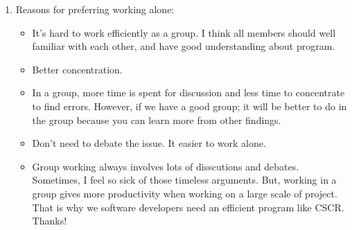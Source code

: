 \begin{enumerate}
\begin{itemize}
\end{itemize}

\item  Reasons for preferring working alone:
\begin{itemize}
\item It's hard to work efficiently as a group.
I think all members should well familiar with each other, and
have good understanding about program.
\item Better concentration.
\item In a group, more time is spent for discussion and less time to
concentrate to find errors.  However, if we have a good group; it will
be better to do in the group because you can learn more from other findings.
\item Don't need to debate the issue.  It easier to work alone.
\item Group working always involves lots of disscutions and
debates. Sometimes, I feel so sick of those timeless arguments.
But, working in a group gives more productivity when working on a
large scale of project. That is why we software developers need an
efficient program like CSCR. Thanks!

\end{itemize}

\end{enumerate}

